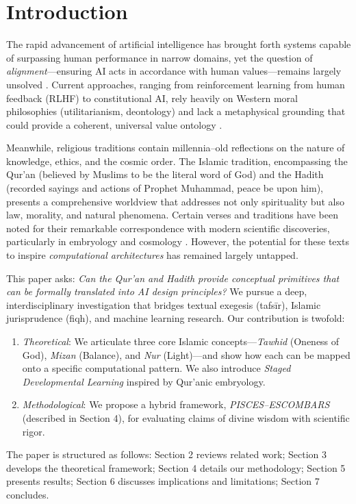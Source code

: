 \documentclass[12pt,twocolumn]{article}
\begin{document}
\section{Introduction}
\noindent The rapid advancement of artificial intelligence has brought forth systems capable of surpassing human performance in narrow domains, yet the question of \emph{alignment}—ensuring AI acts in accordance with human values—remains largely unsolved \citep{Bostrom2014, Christiano2018}. Current approaches, ranging from reinforcement learning from human feedback (RLHF) to constitutional AI, rely heavily on Western moral philosophies (utilitarianism, deontology) and lack a metaphysical grounding that could provide a coherent, universal value ontology \citep{Gabriel2020}.

Meanwhile, religious traditions contain millennia--old reflections on the nature of knowledge, ethics, and the cosmic order. The Islamic tradition, encompassing the Qur'an (believed by Muslims to be the literal word of God) and the Hadith (recorded sayings and actions of Prophet Muhammad, peace be upon him), presents a comprehensive worldview that addresses not only spirituality but also law, morality, and natural phenomena. Certain verses and traditions have been noted for their remarkable correspondence with modern scientific discoveries, particularly in embryology and cosmology \citep{Saadat2009, Suparno2023}. However, the potential for these texts to inspire \emph{computational architectures} has remained largely untapped.

This paper asks: \emph{Can the Qur'an and Hadith provide conceptual primitives that can be formally translated into AI design principles?} We pursue a deep, interdisciplinary investigation that bridges textual exegesis (tafsīr), Islamic jurisprudence (fiqh), and machine learning research. Our contribution is twofold:
\begin{enumerate}[label=\arabic*.]
\item \emph{Theoretical}: We articulate three core Islamic concepts—\emph{Tawhid} (Oneness of God), \emph{Mizan} (Balance), and \emph{Nur} (Light)—and show how each can be mapped onto a specific computational pattern. We also introduce \emph{Staged Developmental Learning} inspired by Qur'anic embryology.
\item \emph{Methodological}: We propose a hybrid framework, \emph{PISCES--ESCOMBARS} (described in Section 4), for evaluating claims of divine wisdom with scientific rigor.
\end{enumerate}
The paper is structured as follows: Section 2 reviews related work; Section 3 develops the theoretical framework; Section 4 details our methodology; Section 5 presents results; Section 6 discusses implications and limitations; Section 7 concludes.
\end{document}
